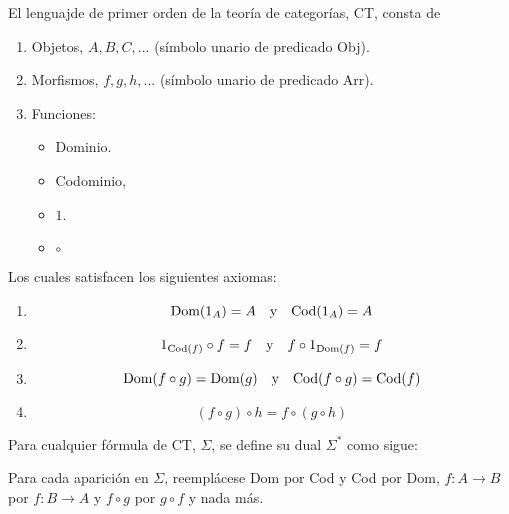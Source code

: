 \documentclass[12pt]{report}
\theoremstyle{largebreak}
\newcommand\cf[3]{\ensuremath{#1:#2\rightarrow#3}}
\begin{document}
    \begin{mydef}
        El lenguajde de primer orden de la teoría de categorías, CT, consta de
        \begin{enumerate}
            \item Objetos, $A,B,C,...$ (símbolo unario de predicado Obj).
            \item Morfismos, $f,g,h,...$ (símbolo unario de predicado Arr).
            \item Funciones:
            \begin{itemize}
                \item Dominio.
                \item Codominio,
                \item $1$.
                \item $\circ$
            \end{itemize}
        \end{enumerate}
        Los cuales satisfacen los siguientes axiomas:
        \begin{enumerate}
            \item \begin{equation*}
                \textup{Dom}(1_A)=A\quad\textup{y}\quad \textup{Cod}(1_A)=A
            \end{equation*}
            \item \begin{equation*}
                1_{ \textup{Cod}(f)}\circ f=f\quad\textup{y}\quad f\circ 1_{\textup{Dom}(f)}=f
            \end{equation*}
            \item \begin{equation*}
                \textup{Dom}(f\circ g)=\textup{Dom}(g)\quad\textup{y}\quad\textup{Cod}(f\circ g)=\textup{Cod}(f)
            \end{equation*}
            \item \begin{equation*}
                (f\circ g)\circ h=f\circ (g\circ h)
            \end{equation*}
        \end{enumerate}
        Para cualquier fórmula de CT, $\Sigma$, se define su dual $\Sigma^*$ como sigue:

        Para cada aparición en $\Sigma$, reemplácese Dom por Cod y Cod por Dom, $\cf{f}{A}{B}$ por $\cf{f}{B}{A}$ y $f\circ g$ por $g\circ f$ y nada más.
    \end{mydef}
\end{document}
